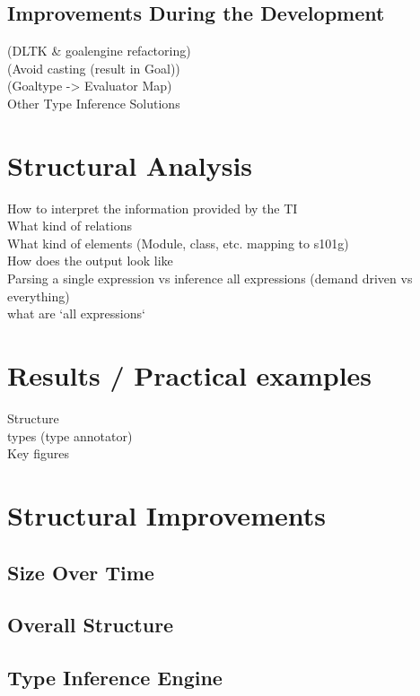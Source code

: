 \documentclass[12pt,halfparskip]{scrreprt}
\begin{document}
\section{Improvements During the Development}
 (DLTK \& goalengine refactoring) \\
 (Avoid casting (result in Goal))\\
 (Goaltype -> Evaluator Map)\\
Other Type Inference Solutions\\

\chapter{Structural Analysis}
How to interpret the information provided by the TI \\
What kind of relations \\
What kind of elements (Module, class, etc. mapping to s101g) \\
How does the output look like \\
Parsing a single expression vs inference all expressions (demand driven vs everything)\\
 what are `all expressions`\\

\chapter{Results / Practical examples}
Structure \\
types (type annotator)\\
Key figures\\



\chapter{Structural Improvements}
\section{Size Over Time}
\section{Overall Structure}
\section{Type Inference Engine}
\end{document}
